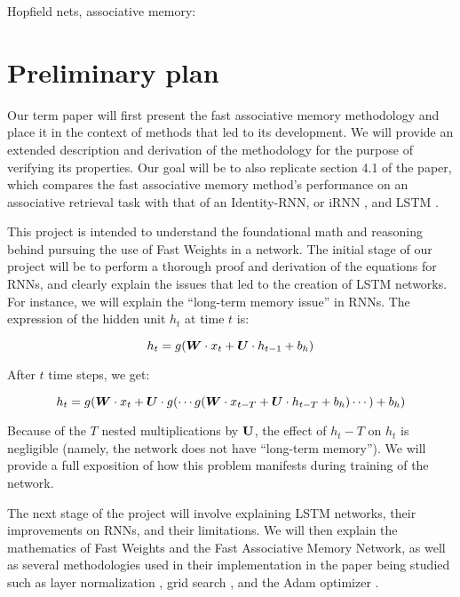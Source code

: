 Hopfield nets, associative memory: \cite{Mackay03informationtheory}

\section{Preliminary plan}

Our term paper will first present the fast associative memory methodology and place it in the context of methods that led to its development. We will provide an extended description and derivation of the methodology for the purpose of verifying its properties. Our goal will be to also replicate section 4.1 of the paper, which compares the fast associative memory method's performance on an associative retrieval task with that of an Identity-RNN, or iRNN \cite{DBLP:journals/corr/TalathiV15}, and LSTM \cite{DBLP:conf/nips/BaHMLI16}.

This project is intended to understand the foundational math and reasoning behind pursuing the use of Fast Weights in a network. The initial stage of our project will be to perform a thorough proof and derivation of the equations for RNNs, and clearly explain the issues that led to the creation of LSTM networks. For instance, we will explain the ``long-term memory issue'' in RNNs. The expression of the hidden unit $h_t$ at time $t$ is:

\begin{equation*}
  h_t = g(\boldsymbol{W} \cdot x_t + \boldsymbol{U} \cdot h_{t-1} + b_h)
\end{equation*}

After $t$ time steps, we get:

\begin{equation*}
  h_t = g(\boldsymbol{W} \cdot x_t + \boldsymbol{U} \cdot g(\cdots g(\boldsymbol{W} \cdot x_{t-T} + \boldsymbol{U} \cdot h_{t-T} + b_h) \cdots) + b_h)
\end{equation*}

Because of the $T$ nested multiplications by $\textbf U$, the effect of $h_t-T$ on $h_t$ is negligible (namely, the network does not have ``long-term memory''). We will provide a full exposition of how this problem manifests during training of the network.

The next stage of the project will involve explaining LSTM networks, their improvements on RNNs, and their limitations. We will then explain the mathematics of Fast Weights and the Fast Associative Memory Network, as well as several methodologies used in their implementation in the paper being studied such as layer normalization \cite{DBLP:journals/corr/BaKH16}, grid search \cite{Goodfellow-et-al-2016}, and the Adam optimizer \cite{DBLP:journals/corr/KingmaB14}.

